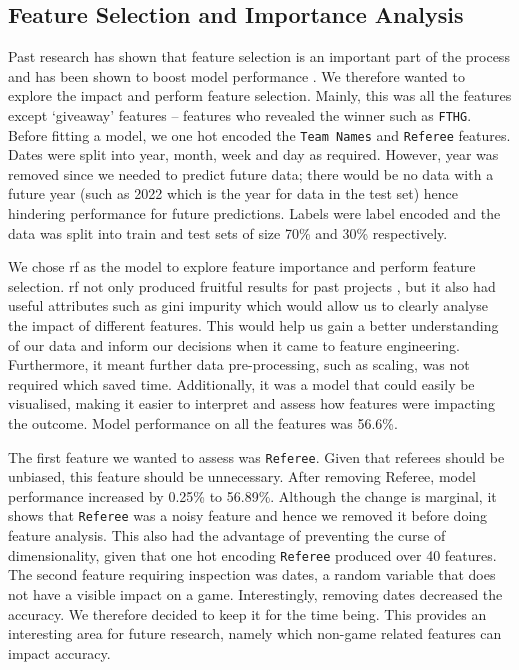 \documentclass{article}
\newcommand{\sw}[1]{\texttt{#1}}
\begin{document}
\subsection{Feature Selection and Importance Analysis}
\label{featureselection}

Past research has shown that feature selection is an important part of the process and has been shown to boost model performance \cite{horvat2020use}. We therefore wanted to explore the impact and perform feature selection. Mainly, this was all the features except ‘giveaway’ features – features who revealed the winner such as \sw{FTHG}. Before fitting a model, we one hot encoded the \sw{Team Names} and \sw{Referee} features. Dates were split into year, month, week and day as required. However, year was removed since we needed to predict future data; there would be no data with a future year (such as 2022 which is the year for data in the test set) hence hindering performance for future predictions. Labels were label encoded and the data was split into train and test sets of size 70\% and 30\% respectively.  

We chose \gls{rf} as the model to explore feature importance and perform feature selection. \gls{rf} not only produced fruitful results for past projects \cite{horvat2020use}, but it also had useful attributes such as gini impurity \cite{dubeymediumrandomforest} which would allow us to clearly analyse the impact of different features. This would help us gain a better understanding of our data and inform our decisions when it came to feature engineering. Furthermore, it meant further data pre-processing, such as scaling, was not required which saved time. Additionally, it was a model that could easily be visualised, making it easier to interpret and assess how features were impacting the outcome. Model performance on all the features was 56.6\%.  

The first feature we wanted to assess was \sw{Referee}. Given that referees should be unbiased, this feature should be unnecessary. After removing Referee, model performance increased by 0.25\% to 56.89\%. Although the change is marginal, it shows that \sw{Referee} was a noisy feature and hence we removed it before doing feature analysis. This also had the advantage of preventing the curse of dimensionality, given that one hot encoding \sw{Referee} produced over 40 features. The second feature requiring inspection was dates, a random variable that does not have a visible impact on a game. Interestingly, removing dates decreased the accuracy. We therefore decided to keep it for the time being. This provides an interesting area for future research, namely which non-game related features can impact accuracy. 
\end{document}
